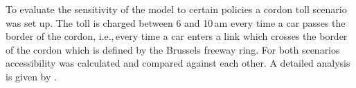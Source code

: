 To evaluate the sensitivity of the model to certain policies a cordon toll scenario was set up. The toll is charged between 6 and 10\,am every time a car passes the border of the cordon, i.e.,\,every time a car enters a link which crosses the border of the cordon which is defined by the Brussels freeway ring. For both scenarios accessibility was calculated and compared against each other. A detailed analysis is given by \citet{RoederNagel2013SketchPlanningBrussels}.

